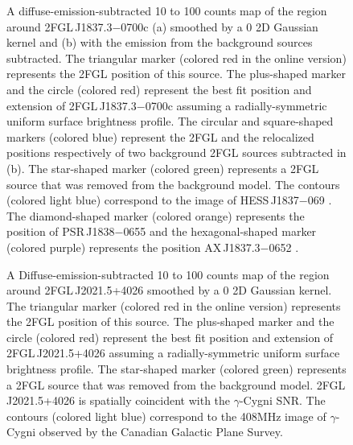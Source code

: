 \documentclass[12pt,preprint]{aastex}
\newif\ifcolorfigure
\newcommand{\gev}{\text{GeV}\xspace}
\newcommand{\tev}{\text{TeV}\xspace}
\begin{document}
\begin{figure}
    \ifcolorfigure
      \plotone{source_plots/source_HESS_J1837-069_color.eps}
    \else
    \fi
  \caption{
  A diffuse-emission-subtracted 10 \gev to 100 \gev counts map of the
  region around 2FGL\,J1837.3$-$0700c (a) smoothed by a 0 2D Gaussian
  kernel and (b) with the emission from the background sources subtracted.
  The triangular marker (colored red in the online version) represents
  the 2FGL
  position of this source. 
  The plus-shaped marker and 
  the circle (colored red) represent the best fit position and extension
  of 2FGL\,J1837.3$-$0700c assuming a radially-symmetric uniform surface
  brightness profile. The circular and square-shaped markers (colored
  blue) represent the 2FGL and the relocalized positions respectively of
  two background 2FGL sources subtracted in (b).  The star-shaped marker
  (colored green) represents a 2FGL source that was removed from the
  background model.  The contours (colored light blue) correspond to
  the \tev image of HESS\,J1837$-$069
  \citep{hess_plane_survey}.
  The diamond-shaped marker (colored orange) represents the position of PSR\,J1838$-$0655
  and the hexagonal-shaped marker (colored purple) represents the position AX\,J1837.3$-$0652
  \citep{pulsations_HESS_J1837-069}.
  }\label{1FGL_J1837.5-0659c}
\end{figure}


\begin{figure}
    \ifcolorfigure
      \plotone{source_plots/source_Gamma_Cygni_color.eps}
    \else
    \fi
  \caption{A Diffuse-emission-subtracted 
  10 \gev to 100 \gev counts map of the
  region around 2FGL\,J2021.5+4026 smoothed by a 0 2D Gaussian
  kernel. The triangular marker (colored red in the online version)
  represents the 2FGL position of this source.  The plus-shaped
  marker and the circle (colored red) represent the best fit position
  and extension of 2FGL\,J2021.5+4026 assuming a radially-symmetric
  uniform surface brightness profile.  
  The star-shaped marker (colored green)
  represents a 2FGL source that was removed from the background model.
  2FGL\,J2021.5+4026
  is spatially coincident with the $\gamma$-Cygni SNR.  The contours
  (colored light blue) correspond to the 408MHz image of $\gamma$-Cygni
  observed by the Canadian Galactic Plane Survey.
  }\label{1FGL_J2020.0+4049}
\end{figure}
\end{document}
